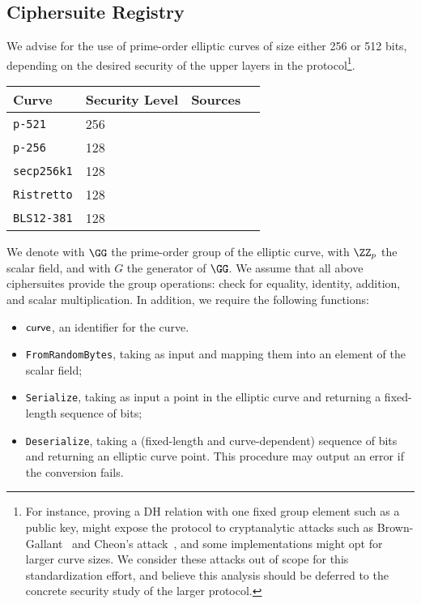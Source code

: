 \documentclass[11pt]{article}
\begin{document}


\subsection{Ciphersuite Registry}
 We advise for the use of prime-order elliptic curves of size either 256 or 512 bits, depending on the desired security of the upper layers in the protocol\footnote{For instance, proving a DH relation with one fixed group element such as a public key, might expose the protocol to cryptanalytic attacks such as Brown-Gallant~\cite{EPRINT:BroGal04} and Cheon’s attack~\cite{EC:Cheon06}, and some implementations might opt for larger curve sizes. We consider these attacks out of scope for this standardization effort, and believe this analysis should be deferred to the concrete security study of the larger protocol.}.

 \vspace{1em}
 \begin{center}
 \begin{tabular}{llcc}
  \hline
  Curve  & Security Level & Sources \\
  \hline
  \verb|p-521|     & 256& \cite{fips2} \\
  \verb|p-256|     & 128 & \cite{fips2}  \\
  \verb|secp256k1| & 128 & \cite{SECG} \\
  \verb|Ristretto| & 128 & \cite{cfrg-ristretto-decaf} \\
  \verb|BLS12-381| & 128 & \cite{bls12} \\
 \end{tabular}
\end{center}
We denote with $\GG$ the prime-order group of the elliptic curve, with $\ZZ_p$ the scalar field, and with $G$ the generator of $\GG$.
We assume that all above ciphersuites provide the group operations: check for equality, identity, addition, and scalar multiplication.
In addition, we require the following functions:

\begin{itemize}
  \item $\textsf{curve}$, an identifier for the curve.
  \item \texttt{FromRandomBytes}, taking as input \seedlen and mapping them into an element of the scalar field;
  \item \texttt{Serialize}, taking as input a point in the elliptic curve and returning a fixed-length sequence of bits;
  \item \texttt{Deserialize}, taking a (fixed-length and curve-dependent) sequence of bits and returning an elliptic curve point. This procedure may output an error if the conversion fails.
\end{itemize}
\end{document}
